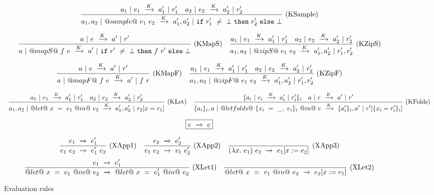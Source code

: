 \begin{figure*}
$$
\ruleIN
{
    \SourceStepK{a_1}{e_1}{a_1'}{r_1'}
    \quad
    \SourceStepK{a_2}{e_2}{a_2'}{r_2'}
}
{
    \SourceStepK{a_1,a_2}{@sample@~e_1~e_2}{a_1',a_2'}{\Ifnbot{r_1'}{r_2'}{\bot}}
}{KSample}
$$

$$
\ruleIN
{
    \SourceStepK{a}{e}{a'}{r'}
}
{
    \SourceStepK{a}{@mapS@~f~e}{a'}{\Ifnbot{r'}{f~r'}{\bot}}
}{KMapS}
\ruleIN
{
    \SourceStepK{a_1}{e_1}{a_1'}{r_1'}
    \quad
    \SourceStepK{a_2}{e_2}{a_2'}{r_2'}
}
{
    \SourceStepK{a_1,a_2}{@zipS@~e_1~e_2}{a_1',a_2'}{r_1',r_2'}
}{KZipS}
$$

$$
\ruleIN
{
    \SourceStepK{a}{e}{a'}{r'}
}
{
    \SourceStepK{a}{@mapF@~f~e}{a'}{f~r}
}{KMapF}
\ruleIN
{
    \SourceStepK{a_1}{e_1}{a_1'}{r_1'}
    \quad
    \SourceStepK{a_2}{e_2}{a_2'}{r_2'}
}
{
    \SourceStepK{a_1,a_2}{@zipF@~e_1~e_2}{a_1',a_2'}{r_1',r_2'}
}{KZipF}
$$

$$
\ruleIN
{
    \SourceStepK{a_1}{e_1}{a_1'}{r_1'}
    \quad
    \SourceStepK{a_2}{e_2}{a_2'}{r_2'}
}
{
    \SourceStepK{a_1,a_2}{@let@~x~=~e_1~@in@~e_2}{a_1',a_2'}{r_2[x=r_1]}
}{KLet}
\ruleIN
{
    \{ \SourceStepK{a_i}{e_i}{a_i'}{r_i'} \}_i
    \quad
    \SourceStepK{a}{e}{a'}{r'}
}
{
    \SourceStepK{\{a_i\}_i,a}{@let folds@~\{x_i~=~\_,~e_i\}_i~@in@~e}{\{a_i'\}_i,a'}{r'[\{x_i=r_i'\}_i]}
}{KFolds}
$$



$$
\boxed{\SourceStepX{e}{e}}
$$

$$
\ruleIN
{
    \SourceStepX{e_1}{e_1'}
}
{
    \SourceStepX{e_1~e_2}{e_1'~e_2}
}{XApp1}
\ruleIN
{
    \SourceStepX{e_2}{e_2'}
}
{
    \SourceStepX{v_1~e_2}{v_1~e_2'}
}{XApp2}
\ruleAx
{
    \SourceStepX{(\lambda{}x.~e_1)~e_2}{e_1[x:=e_2]}
}{XApp3}
$$
$$
\ruleIN
{
    \SourceStepX{e_1}{e_1'}
}
{
    \SourceStepX{@let@~x~=~e_1~@in@~e_2}{@let@~x~=~e_1'~@in@~e_2}
}{XLet1}
\ruleAx
{
    \SourceStepX{@let@~x~=~v_1~@in@~e_2}{e_2[x:=v_1]}
}{XLet2}
$$

\caption{Evaluation rules}
\label{fig:source:eval}
\end{figure*}


